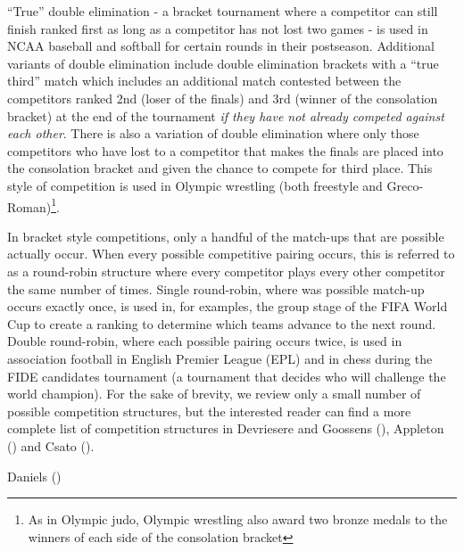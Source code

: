 \documentclass[
  12pt,
]{article}
\begin{document}
``True'' double elimination - a bracket tournament where a competitor
can still finish ranked first as long as a competitor has not lost two
games - is used in NCAA baseball and softball for certain rounds in
their postseason. Additional variants of double elimination include
double elimination brackets with a ``true third'' match which includes
an additional match contested between the competitors ranked 2nd (loser
of the finals) and 3rd (winner of the consolation bracket) at the end of
the tournament \emph{if they have not already competed against each
other}. There is also a variation of double elimination where only those
competitors who have lost to a competitor that makes the finals are
placed into the consolation bracket and given the chance to compete for
third place. This style of competition is used in Olympic wrestling
(both freestyle and Greco-Roman)\footnote{As in Olympic judo, Olympic
  wrestling also award two bronze medals to the winners of each side of
  the consolation bracket}.

In bracket style competitions, only a handful of the match-ups that are
possible actually occur. When every possible competitive pairing occurs,
this is referred to as a round-robin structure where every competitor
plays every other competitor the same number of times. Single
round-robin, where was possible match-up occurs exactly once, is used
in, for examples, the group stage of the FIFA World Cup to create a
ranking to determine which teams advance to the next round. Double
round-robin, where each possible pairing occurs twice, is used in
association football in English Premier League (EPL) and in chess during
the FIDE candidates tournament (a tournament that decides who will
challenge the world champion). For the sake of brevity, we review only a
small number of possible competition structures, but the interested
reader can find a more complete list of competition structures in
Devriesere and Goossens (), Appleton
() and Csato
().

Daniels ()
\end{document}
